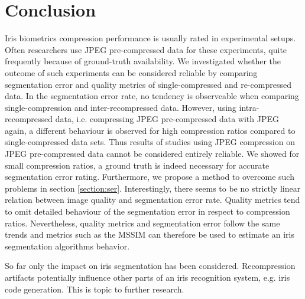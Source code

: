 \documentclass[10pt,twocolumn,letterpaper]{article}
\begin{document}
\section{Conclusion}
\label{section:conclusion}
Iris biometrics compression performance is usually rated in experimental setups. Often researchers use JPEG pre-compressed data for these experiments, quite frequently because of ground-truth availability. We investigated whether the outcome of such experiments can be considered reliable by comparing segmentation error and quality metrics of single-compressed and re-compressed data.  In the segmentation error rate, no tendency is observeable when comparing single-compression and inter-recompressed data. However, using intra-recompressed data, i.e. compressing JPEG pre-compressed data with JPEG again, a different behaviour is observed for high compression ratios compared to single-compressed data sets. Thus results of studies using JPEG compression on JPEG pre-compressed data cannot be considered entirely reliable. We showed for small compression ratios, a ground truth is indeed necessary for accurate segmentation error rating. Furthermore, we propose a method to overcome such problems in section \ref{section:ser}. Interestingly, there seems to be no strictly linear relation between image quality and segmentation error rate. Quality metrics tend to omit detailed behaviour of the segmentation error in respect to compression ratios. Nevertheless, quality metrics and segmentation error follow the same trends and metrics such as the MSSIM can therefore be used to estimate an iris segmentation algorithms behavior. 

So far only the impact on iris segmentation has been considered. Recompression artifacts potentially influence other parts of an iris recognition system, e.g. iris code generation. This is topic to further research.           


{\small


}
\end{document}
